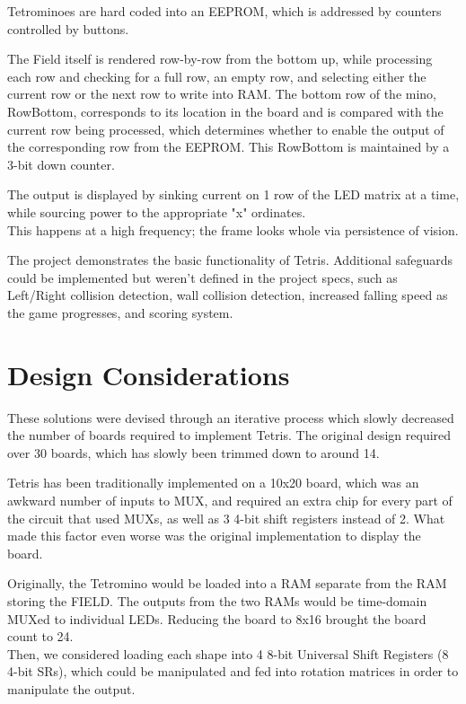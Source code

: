 \documentclass[letterpaper,titlepage,oneside]{article}
\begin{document}
Tetrominoes are hard coded into an EEPROM, which is addressed by counters controlled by buttons.

The Field itself is rendered row-by-row from the bottom up, while processing each row and checking for a full row, an empty row, and selecting either the current row or the next row to write into RAM. The bottom row of the mino, RowBottom, corresponds to its location in the board and is compared with the current row being processed, which determines whether to enable the output of the corresponding row from the EEPROM. This RowBottom is maintained by a 3-bit down counter.

The output is displayed by sinking current on 1 row of the LED matrix at a time, while sourcing power to the appropriate "x" ordinates. \\
This happens at a high frequency; the frame looks whole via persistence of vision.

The project demonstrates the basic functionality of Tetris. Additional safeguards could be implemented but weren't defined in the project specs, such as Left/Right collision detection, wall collision detection, increased falling speed as the game progresses, and scoring system.
\pagebreak
\section{Design Considerations}

These solutions were devised through an iterative process which slowly decreased the number of boards required to implement Tetris. The original design required over 30 boards, which has slowly been trimmed down to around 14. 

Tetris has been traditionally implemented on a 10x20 board, which was an awkward number of inputs to MUX, and required an extra chip for every part of the circuit that used MUXs, as well as 3 4-bit shift registers instead of 2. What made this factor even worse was the original implementation to display the board.

Originally, the Tetromino would be loaded into a RAM separate from the RAM storing the FIELD. The outputs from the two RAMs would be time-domain MUXed to individual LEDs. Reducing the board to 8x16 brought the board count to 24. \\
Then, we considered loading each shape into 4 8-bit Universal Shift Registers (8 4-bit SRs), which could be manipulated and fed into rotation matrices in order to manipulate the output. 
\end{document}
